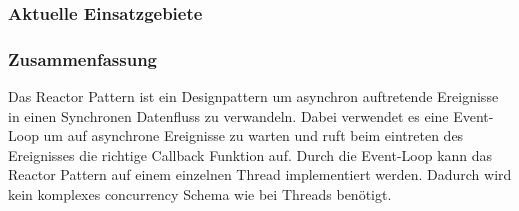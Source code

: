 \subsubsection{Aktuelle Einsatzgebiete}


\subsubsection{Zusammenfassung}

Das Reactor Pattern ist ein Designpattern um asynchron auftretende Ereignisse in einen Synchronen Datenfluss zu verwandeln. Dabei verwendet es eine Event-Loop um auf asynchrone Ereignisse zu warten und ruft beim eintreten des Ereignisses die richtige Callback Funktion auf. Durch die Event-Loop kann das Reactor Pattern auf einem einzelnen Thread implementiert werden. Dadurch wird kein komplexes concurrency Schema wie bei Threads benötigt.